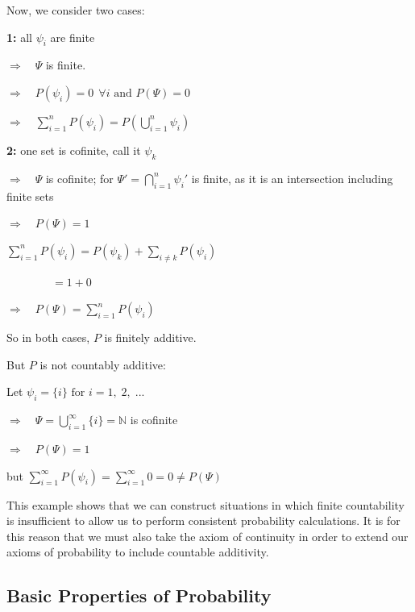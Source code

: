 \documentclass[12pt,a4paper]{article}
\begin{document}
\noindent Now, we consider two cases:\par
\vspace{10pt}
{\bf 1: } all $\psi_i$ are finite\par
\indent\indent $\Rightarrow \quad\Psi$ is finite.\par
\indent\indent $\Rightarrow \quad P(\psi_i) = 0 \:\:\forall i \text{ and } P(\Psi) = 0$\par
\indent\indent $\Rightarrow \quad\sum\limits_{i=1}^{n}P(\psi_i) = P(\bigcup_{i=1}^{n}\psi_i)$\par
\vspace{10pt}
{\bf 2: } one set is cofinite, call it $\psi_k$\par
\indent\indent $\Rightarrow\quad \Psi$ is cofinite; for $\Psi' = \bigcap_{i=1}^n\psi_i'$ is finite, as it is an intersection including finite sets\par
\indent\indent $\Rightarrow\quad P(\Psi)=1$\par
\indent\indent $\sum\limits_{i=1}^nP(\psi_i) = P(\psi_k) + \sum\limits_{i\neq k}P(\psi_i)$\par
\indent\indent $\qquad\qquad = 1 + 0$\par
\indent\indent $\Rightarrow\quad P(\Psi) = \sum\limits_{i=1}^nP(\psi_i)$\par
So in both cases, $P$ is finitely additive.\par
\vspace{12pt}
But $P$ is not countably additive:\par
Let $\psi_i = \{i\} \text{ for } i = 1,\;2,\;...$\par
$\Rightarrow\quad \Psi = \bigcup_{i=1}^{\infty}\{i\} = \mathbb{N}$ is cofinite\par
$\Rightarrow\quad P(\Psi) = 1$\par
but $\sum\limits_{i=1}^{\infty}P(\psi_i) = \sum\limits_{i=1}^{\infty}0 = 0 \neq P(\Psi)$\par
\vspace{12pt}
\indent This example shows that we can construct situations in which finite countability is insufficient to allow us to perform consistent probability calculations. It is for this reason that we must also take the axiom of continuity in order to extend our axioms of probability to include countable additivity.


\subsection{Basic Properties of Probability}$\;$
\end{document}
